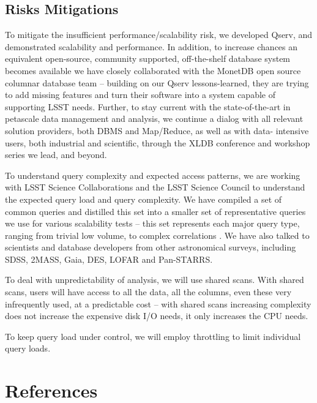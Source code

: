 \documentclass[DM,lsstdraft,toc]{lsstdoc}
\begin{document}
\subsection{Risks Mitigations}\label{risks-mitigations}

To mitigate the insufficient performance/scalability risk, we developed Qserv,
and demonstrated scalability and performance. In addition, to increase chances
an equivalent open-source, community supported, off-the-shelf database system
becomes available we have closely collaborated with the MonetDB open source
columnar database team -- building on our Qserv lessons-learned, they are
trying to add missing features and turn their software into a system capable
of supporting LSST needs. Further, to stay current with the state-of-the-art
in petascale data management and analysis, we continue a dialog with all
relevant solution providers, both DBMS and Map/Reduce, as well as with data-
intensive users, both industrial and scientific, through the XLDB conference
and workshop series we lead, and beyond.

To understand query complexity and expected access patterns, we are
working with LSST Science Collaborations and the LSST Science Council to
understand the expected query load and query complexity. We have
compiled a set of common queries \citep{CommonQueries} and distilled
this set into a smaller set of representative queries we use for various
scalability tests -- this set represents each major query type, ranging
from trivial low volume, to complex correlations \citep{PerfTests}. We
have also talked to scientists and database developers from other
astronomical surveys, including SDSS, 2MASS, Gaia, DES, LOFAR and
Pan-STARRS.

To deal with unpredictability of analysis, we will use shared scans.
With shared scans, users will have access to all the data, all the
columns, even these very infrequently used, at a predictable cost --
with shared scans increasing complexity does not increase the expensive
disk I/O needs, it only increases the CPU needs.

To keep query load under control, we will employ throttling to limit
individual query loads.

\section{References}\label{references}
\renewcommand{\refname}{}

\end{document}
